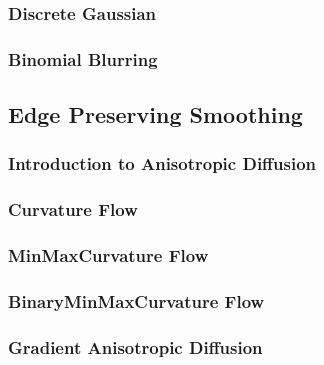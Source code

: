 \subsubsection{Discrete Gaussian}
\label{sec:DiscreteGaussianImageFilter}




\subsubsection{Binomial Blurring}
\label{sec:BinomialBlurImageFilter}





\subsection{Edge Preserving Smoothing}
\label{sec:EdgePreservingSmoothingFilters}

\subsubsection{Introduction to Anisotropic Diffusion}


\subsubsection{Curvature Flow}
\label{sec:CurvatureFlowImageFilter}




\subsubsection{MinMaxCurvature Flow}
\label{sec:MinMaxCurvatureFlowImageFilter}





\subsubsection{BinaryMinMaxCurvature Flow}
\label{sec:BinaryMinMaxCurvatureFlowImageFilter}




\subsubsection{Gradient Anisotropic Diffusion}
\label{sec:GradientAnisotropicDiffusionImageFilter}

